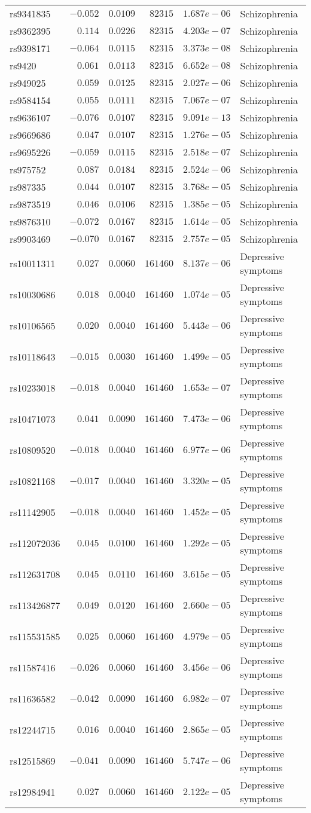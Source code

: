 \begin{tabular}{lrrrrl}
rs9341835&$-0.052$&$0.0109$&$ 82315$&$1.687e-06$&Schizophrenia\tabularnewline
rs9362395&$ 0.114$&$0.0226$&$ 82315$&$4.203e-07$&Schizophrenia\tabularnewline
rs9398171&$-0.064$&$0.0115$&$ 82315$&$3.373e-08$&Schizophrenia\tabularnewline
rs9420&$ 0.061$&$0.0113$&$ 82315$&$6.652e-08$&Schizophrenia\tabularnewline
rs949025&$ 0.059$&$0.0125$&$ 82315$&$2.027e-06$&Schizophrenia\tabularnewline
rs9584154&$ 0.055$&$0.0111$&$ 82315$&$7.067e-07$&Schizophrenia\tabularnewline
rs9636107&$-0.076$&$0.0107$&$ 82315$&$9.091e-13$&Schizophrenia\tabularnewline
rs9669686&$ 0.047$&$0.0107$&$ 82315$&$1.276e-05$&Schizophrenia\tabularnewline
rs9695226&$-0.059$&$0.0115$&$ 82315$&$2.518e-07$&Schizophrenia\tabularnewline
rs975752&$ 0.087$&$0.0184$&$ 82315$&$2.524e-06$&Schizophrenia\tabularnewline
rs987335&$ 0.044$&$0.0107$&$ 82315$&$3.768e-05$&Schizophrenia\tabularnewline
rs9873519&$ 0.046$&$0.0106$&$ 82315$&$1.385e-05$&Schizophrenia\tabularnewline
rs9876310&$-0.072$&$0.0167$&$ 82315$&$1.614e-05$&Schizophrenia\tabularnewline
rs9903469&$-0.070$&$0.0167$&$ 82315$&$2.757e-05$&Schizophrenia\tabularnewline
rs10011311&$ 0.027$&$0.0060$&$161460$&$8.137e-06$&Depressive symptoms\tabularnewline
rs10030686&$ 0.018$&$0.0040$&$161460$&$1.074e-05$&Depressive symptoms\tabularnewline
rs10106565&$ 0.020$&$0.0040$&$161460$&$5.443e-06$&Depressive symptoms\tabularnewline
rs10118643&$-0.015$&$0.0030$&$161460$&$1.499e-05$&Depressive symptoms\tabularnewline
rs10233018&$-0.018$&$0.0040$&$161460$&$1.653e-07$&Depressive symptoms\tabularnewline
rs10471073&$ 0.041$&$0.0090$&$161460$&$7.473e-06$&Depressive symptoms\tabularnewline
rs10809520&$-0.018$&$0.0040$&$161460$&$6.977e-06$&Depressive symptoms\tabularnewline
rs10821168&$-0.017$&$0.0040$&$161460$&$3.320e-05$&Depressive symptoms\tabularnewline
rs11142905&$-0.018$&$0.0040$&$161460$&$1.452e-05$&Depressive symptoms\tabularnewline
rs112072036&$ 0.045$&$0.0100$&$161460$&$1.292e-05$&Depressive symptoms\tabularnewline
rs112631708&$ 0.045$&$0.0110$&$161460$&$3.615e-05$&Depressive symptoms\tabularnewline
rs113426877&$ 0.049$&$0.0120$&$161460$&$2.660e-05$&Depressive symptoms\tabularnewline
rs115531585&$ 0.025$&$0.0060$&$161460$&$4.979e-05$&Depressive symptoms\tabularnewline
rs11587416&$-0.026$&$0.0060$&$161460$&$3.456e-06$&Depressive symptoms\tabularnewline
rs11636582&$-0.042$&$0.0090$&$161460$&$6.982e-07$&Depressive symptoms\tabularnewline
rs12244715&$ 0.016$&$0.0040$&$161460$&$2.865e-05$&Depressive symptoms\tabularnewline
rs12515869&$-0.041$&$0.0090$&$161460$&$5.747e-06$&Depressive symptoms\tabularnewline
rs12984941&$ 0.027$&$0.0060$&$161460$&$2.122e-05$&Depressive symptoms\tabularnewline

\end{tabular}
